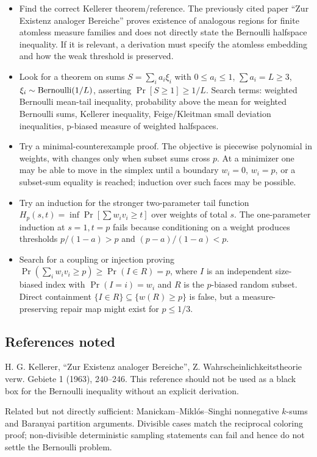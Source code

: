 \documentclass[12pt]{article}
\begin{document}
\begin{itemize}
\item Find the correct Kellerer theorem/reference.  The previously cited paper
  ``Zur Existenz analoger Bereiche'' proves existence of analogous regions for
  finite atomless measure families and does not directly state the Bernoulli
  halfspace inequality.  If it is relevant, a derivation must specify the
  atomless embedding and how the weak threshold is preserved.
\item Look for a theorem on sums \(S=\sum_i a_i\xi_i\) with \(0\le a_i\le1\),
  \(\sum a_i=L\ge3\), \(\xi_i\sim{\rm Bernoulli}(1/L)\), asserting
  \(\Pr[S\ge1]\ge1/L\).  Search terms: weighted Bernoulli mean-tail inequality,
  probability above the mean for weighted Bernoulli sums, Kellerer inequality,
  Feige/Kleitman small deviation inequalities, p-biased measure of weighted
  halfspaces.
\item Try a minimal-counterexample proof.  The objective is piecewise polynomial
  in weights, with changes only when subset sums cross \(p\).  At a minimizer
  one may be able to move in the simplex until a boundary \(w_i=0\), \(w_i=p\),
  or a subset-sum equality is reached; induction over such faces may be possible.
\item Try an induction for the stronger two-parameter tail function
  \(H_{p}(s,t)=\inf\Pr[\sum w_i v_i\ge t]\) over weights of total \(s\).  The
  one-parameter induction at \(s=1,t=p\) fails because conditioning on a weight
  produces thresholds \(p/(1-a)>p\) and \((p-a)/(1-a)<p\).
\item Search for a coupling or injection proving
  \(\Pr(\sum_i w_i v_i\ge p)\ge \Pr(I\in R)=p\), where \(I\) is an independent
  size-biased index with \(\Pr(I=i)=w_i\) and \(R\) is the \(p\)-biased random
  subset.  Direct containment \(\{I\in R\}\subseteq\{w(R)\ge p\}\) is false, but
  a measure-preserving repair map might exist for \(p\le1/3\).
\end{itemize}

\subsection*{References noted}

H. G. Kellerer, ``Zur Existenz analoger Bereiche'', Z. Wahrscheinlichkeitstheorie
verw. Gebiete 1 (1963), 240--246.  This reference should not be used as a black
box for the Bernoulli inequality without an explicit derivation.

Related but not directly sufficient: Manickam--Miklós--Singhi nonnegative
\(k\)-sums and Baranyai partition arguments.  Divisible cases match the
reciprocal coloring proof; non-divisible deterministic sampling statements can
fail and hence do not settle the Bernoulli problem.
\end{document}
